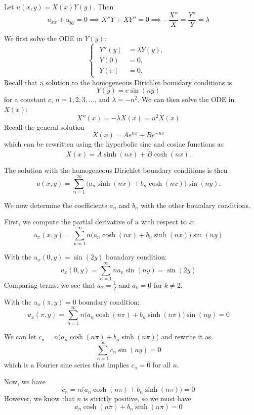 \documentclass[plain]{pset}
\begin{document}
\begin{solution}
    Let \(u(x, y) = X(x)Y(y)\). Then
    \[u_{xx} + u_{yy} = 0 \implies X''Y + XY'' = 0 \implies -\frac{X''}{X} = \frac{Y''}{Y} = \lambda\]

    We first solve the ODE in \(Y(y)\):
    \[
        \begin{cases}
            \begin{aligned}
                Y''(y) & = \lambda Y(y), \\
                Y(0)   & = 0,            \\
                Y(\pi) & = 0.
            \end{aligned}
        \end{cases}
    \]
    Recall that a solution to the homogeneous Dirichlet boundary conditions is
    \[Y(y) = c \sin(ny)\]
    for a constant \(c\), \(n = 1, 2, 3, \ldots\), and \(\lambda = -n^2\). We can then solve the ODE in \(X(x)\):
    \[X''(x) = -\lambda X(x) = n^2 X(x)\]
    Recall the general solution
    \[X(x) = Ae^{nx} + Be^{-nx}\]
    which can be rewritten using the hyperbolic sine and cosine functions as
    \[X(x) = \tilde{A}\sinh(nx) + \tilde{B}\cosh(nx).\]

    The solution with the homogeneous Dirichlet boundary conditions is then
    \[u(x, y) = \sum_{n=1}^\infty \bigl(a_n\sinh(nx) + b_n\cosh(nx)\bigr)\sin(ny).\]

    We now determine the coefficients \(a_n\) and \(b_n\) with the other boundary conditions.

    First, we compute the partial derivative of \(u\) with respect to \(x\):
    \[u_x(x, y) = \sum_{n=1}^\infty n\bigl(a_n\cosh(nx) + b_n\sinh(nx)\bigr)\sin(ny)\]

    With the \(u_x(0, y) = \sin(2y)\) boundary condition:
    \[u_x(0, y) = \sum_{n=1}^\infty n a_n \sin(ny) = \sin(2y)\]
    Comparing terms, we see that \(a_2 = \frac{1}{2}\) and \(a_k = 0\) for \(k \neq 2\).

    With the \(u_x(\pi, y) = 0\) boundary condition:
    \[u_x(\pi, y) = \sum_{n=1}^\infty n\bigl(a_n\cosh(n\pi) + b_n\sinh(n\pi)\bigr)\sin(ny) = 0\]

    We can let \(c_n = n\bigl(a_n\cosh(n\pi) + b_n\sinh(n\pi)\bigr)\) and rewrite it as
    \[\sum_{n=1}^\infty c_n \sin(ny) = 0\]
    which is a Fourier sine series that implies \(c_n = 0\) for all \(n\).

    Now, we have
    \[c_n = n\bigl(a_n\cosh(n\pi) + b_n\sinh(n\pi)\bigr) = 0\]
    However, we know that \(n\) is strictly positive, so we must have
    \[a_n\cosh(n\pi) + b_n\sinh(n\pi) = 0\]


\end{solution}
\end{document}
